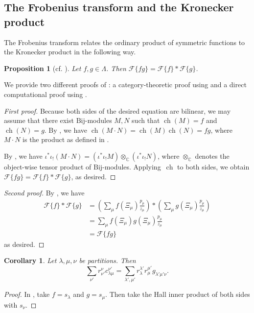 \documentclass[11pt]{article}
\newtheorem{prop}[theo]{Proposition}
\newtheorem{coro}[theo]{Corollary}
\theoremstyle{definition}
\numberwithin{equation}{section}
\newcommand{\K}{\mathbb{C}}
\newcommand{\rmBij}{\mathrm{Bij}}
\newcommand{\F}[1]{\mathscr{F}\{#1\}}
\DeclareMathOperator{\ch}{ch}
\begin{document}
\subsection{The Frobenius transform and the Kronecker product}
The Frobenius transform relates the ordinary product of symmetric functions to the Kronecker product in the following way.
\begin{prop}[{cf. \cite[Section~2.3]{MR4275829}}]
\label{proposition:kronecker}
Let $f, g \in \Lambda$. Then $\F{fg} = \F{f} \ast \F{g}$.
\end{prop}
We provide two different proofs of : a category-theoretic proof using  and a direct computational proof using .
\begin{proof}[First proof]
    Because both sides of the desired equation are bilinear, we may assume that there exist $\rmBij$-modules $M, N$ such that $\ch(M) = f$ and $\ch(N) = g$. By , we have $\ch(M \cdot N) = \ch(M) \ch(N) = fg$, where $M \cdot N$ is the product as defined in .
    
    By \cite[Equation~2.1(ii)]{MR0927763}, we have $\iota^* \iota_! (M \cdot N) = (\iota^* \iota_! M) \otimes_{\K} (\iota^* \iota_! N)$, where $\otimes_\K$ denotes the object-wise tensor product of $\rmBij$-modules. Applying~$\ch$ to both sides, we obtain $\F{fg} = \F{f} \ast \F{g}$, as desired.
\end{proof}
\begin{proof}[Second proof]
By , we have
\begin{align*}
    \F{f} \ast \F{g} &= \left(\sum_{\mu} f(\Xi_\mu) \frac{p_\mu}{z_\mu}\right) \ast \left(\sum_{\mu} g(\Xi_\mu) \frac{p_\mu}{z_\mu}\right) \\
    &= \sum_{\mu} f(\Xi_\mu)g(\Xi_\mu) \frac{p_\mu}{z_\mu} \\
    &= \F{fg}
\end{align*}
as desired.
\end{proof}

\begin{coro}
\label{corollary:productcoefficients}
Let $\lambda, \mu, \nu$ be partitions. Then
\[\sum_{\nu'} r^{\nu}_{\nu'} c^{\nu'}_{\lambda\mu} = \sum_{\lambda', \mu'} r^{\lambda'}_{\lambda} r^{\mu'}_{\mu} g_{\lambda'\mu'\nu}.\]
\end{coro}
\begin{proof}
In , take $f = s_\lambda$ and $g = s_\mu$. Then take the Hall inner product of both sides with $s_\nu$.
\end{proof}
\end{document}

